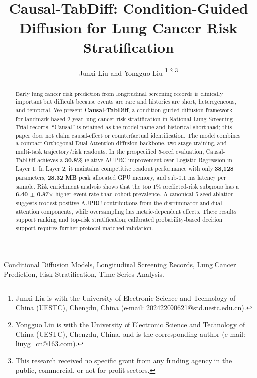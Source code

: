 \documentclass[11pt,journal,twoside]{IEEEtran}
\begin{document}
\title{Causal-TabDiff: Condition-Guided Diffusion for Lung Cancer Risk Stratification}

\author{Junxi Liu and Yongguo Liu
\thanks{Junxi Liu is with the University of Electronic Science and Technology of China (UESTC), Chengdu, China (e-mail: 202422090621@std.uestc.edu.cn).}
\thanks{Yongguo Liu is with the University of Electronic Science and Technology of China (UESTC), Chengdu, China, and is the corresponding author (e-mail: liuyg\_cn@163.com).}
\thanks{This research received no specific grant from any funding agency in the public, commercial, or not-for-profit sectors.}}

\maketitle

\begin{abstract}
Early lung cancer risk prediction from longitudinal screening records is clinically important but difficult because events are rare and histories are short, heterogeneous, and temporal. We present \textbf{Causal-TabDiff}, a condition-guided diffusion framework for landmark-based 2-year lung cancer risk stratification in National Lung Screening Trial records. ``Causal'' is retained as the model name and historical shorthand; this paper does not claim causal-effect or counterfactual identification. The model combines a compact Orthogonal Dual-Attention diffusion backbone, two-stage training, and multi-task trajectory/risk readouts. In the prespecified 5-seed evaluation, Causal-TabDiff achieves a \textbf{30.8\%} relative AUPRC improvement over Logistic Regression in Layer 1. In Layer 2, it maintains competitive readout performance with only \textbf{38,128} parameters, \textbf{28.32 MB} peak allocated GPU memory, and sub-0.1 ms latency per sample. Risk enrichment analysis shows that the top 1\% predicted-risk subgroup has a \textbf{6.40 $\pm$ 0.87$\times$} higher event rate than cohort prevalence. A canonical 5-seed ablation suggests modest positive AUPRC contributions from the discriminator and dual-attention components, while oversampling has metric-dependent effects. These results support ranking and top-risk stratification; calibrated probability-based decision support requires further protocol-matched validation.
\end{abstract}

\begin{IEEEkeywords}
Conditional Diffusion Models, Longitudinal Screening Records, Lung Cancer Prediction, Risk Stratification, Time-Series Analysis.
\end{IEEEkeywords}
\end{document}
